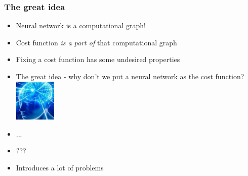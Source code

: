\documentclass{Bredelebeamer}
\begin{document}
\begin{frame}
	\frametitle{The great idea}
	\begin{itemize}[<+->]
		\item Neural network is a computational graph!
		\item Cost function \textit{is a part of} that computational graph
		\item Fixing a cost function has some undesired properties
		\item The great idea - why don't we put a neural network as the cost function? \includegraphics[height=2cm]{expanding_brain.jpeg}
		\item ...
		\item ???
		\item Introduces a lot of problems
	\end{itemize}
\end{frame}
\end{document}
